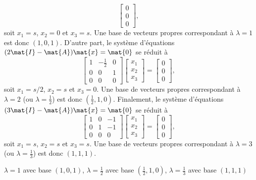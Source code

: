 \begin{exercice}
\begin{sol}
\begin{displaymath}
      \begin{bmatrix} 0 \\ 0 \\ 0 \end{bmatrix},
    \end{displaymath}
    soit $x_1 = s$, $x_2 = 0$ et $x_3 = s$. Une base de vecteurs
    propres correspondant à $\lambda = 1$ est donc $(1, 0, 1)$.
    D'autre part, le système d'équations $(2\mat{I} - \mat{A}) \mat{x}
    = \mat{0}$ se réduit à
    \begin{displaymath}
      \begin{bmatrix}
        1 & -\frac{1}{2} & 0 \\
        0 &  0 & 1 \\
        0 &  0 & 0
      \end{bmatrix}
      \begin{bmatrix} x_1 \\ x_2 \\ x_3 \end{bmatrix} =
      \begin{bmatrix} 0 \\ 0 \\ 0 \end{bmatrix},
    \end{displaymath}
    soit $x_1 = s/2$, $x_2 = s$ et $x_3 = 0$. Une base de vecteurs
    propres correspondant à $\lambda = 2$ (ou $\lambda = \frac{1}{2}$)
    est donc $(\frac{1}{2}, 1, 0)$.  Finalement, le système
    d'équations $(3\mat{I} - \mat{A}) \mat{x} = \mat{0}$ se réduit à
    \begin{displaymath}
      \begin{bmatrix}
        1 &  0 & -1 \\
        0 &  1 & -1 \\
        0 &  0 &  0
      \end{bmatrix}
      \begin{bmatrix} x_1 \\ x_2 \\ x_3 \end{bmatrix} =
      \begin{bmatrix} 0 \\ 0 \\ 0 \end{bmatrix},
    \end{displaymath}
    soit $x_1 = s$, $x_2 = s$ et $x_3 = s$. Une base de vecteurs
    propres correspondant à $\lambda = 3$ (ou $\lambda = \frac{1}{3}$)
    est donc $(1, 1, 1)$.
  \end{sol}
  \begin{rep}
    $\lambda = 1$ avec base $(1, 0, 1)$,
    $\lambda = \frac{1}{2}$ avec base $(\frac{1}{2}, 1, 0)$,
    $\lambda = \frac{1}{3}$ avec base $(1, 1, 1)$
  \end{rep}
\end{exercice}

